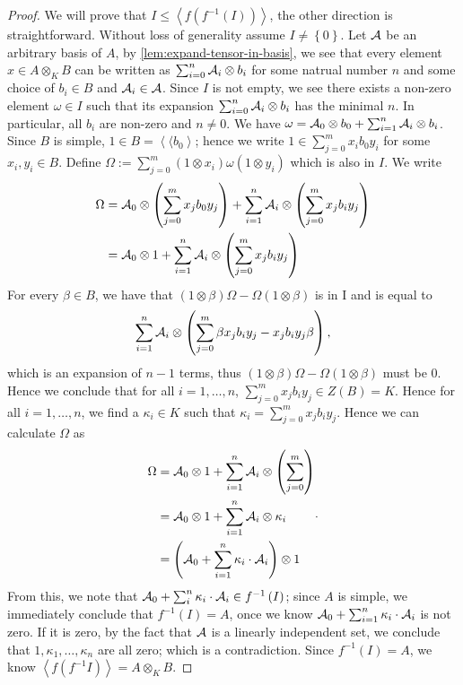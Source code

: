 \begin{proof}
  We will prove that $I \le \left\langle f\left(f^{-1}\left(I\right)\right)\right\rangle$, the other direction is straightforward.
  Without loss of generality assume $I\ne\left\{0\right\}$.
  Let $\mathcal{A}$ be an arbitrary basis of $A$, by \cref{lem:expand-tensor-in-basis}, we see that every element $x \in A\otimes_{K}B$ can be written as $\sum_{i=0}^{n}\mathcal{A}_{i}\otimes b_{i}$ for some natrual number $n$ and some choice of $b_{i}\in B$ and $\mathcal{A}_{i}\in \mathcal{A}$. Since $I$ is not empty, we see there exists a non-zero element $\omega\in I$ such that its expansion $\sum_{i=0}^{n}\mathcal{A}_{i}\otimes b_{i}$ has the minimal $n$. In particular, all $b_{i}$ are non-zero and $n\ne0$. We have $\omega=\mathcal{A}_{0}\otimes b_{0}+\sum_{i=1}^{n}\mathcal{A}_{i}\otimes b_{i}$. Since $B$ is simple, $1 \in B = \left\langle\langle b_{0} \right\rangle$; hence we write $1\in\sum_{j=0}^{m}x_{i}b_{0}y_{i}$ for some $x_{i},y_{i}\in B$. Define $\Omega := \sum_{j=0}^{m}(1\otimes x_{i})\omega(1\otimes y_{i})$ which is also in $I$. We write
\[
  \begin{aligned}
    \Omega &= \mathcal{A}_{0} \otimes \left(\sum_{j=0}^{m}x_{j}b_{0}y_{j}\right) + \sum_{i=1}^{n}\mathcal{A}_{i}\otimes\left(\sum_{j=0}^{m}x_{j}b_{i}y_{j}\right) \\
    &= \mathcal{A}_{0}\otimes 1 + \sum_{i=1}^{n}\mathcal{A}_{i}\otimes\left(\sum_{j=0}^{m}x_{j}b_{i}y_{j}\right)
  \end{aligned}
\]
For every $\beta\in B$, we have that $\left(1\otimes \beta\right)\Omega - \Omega\left(1\otimes \beta\right)$ is in I and is equal to
\[
\sum_{i=1}^{n}\mathcal{A}_{i}\otimes\left(\sum_{j=0}^{m}\beta x_{j}b_{i}y_{j}-x_{j}b_{i}y_{j}\beta\right),
\]
which is an expansion of $n-1$ terms, thus $\left(1\otimes\beta\right)\Omega-\Omega\left(1\otimes\beta\right)$ must be $0$. Hence we conclude that for all $i=1,\dots,n$,   $\sum_{j=0}^{m}x_{j}b_{i}y_{j}\in Z\left(B\right)=K$. Hence for all $i=1,\dots,n$, we find a $\kappa_{i}\in K$ such that $\kappa_{i}=\sum_{j=0}^{m}x_{j}b_{i}y_{j}$. Hence we can calculate $\Omega$ as
\[
  \begin{aligned}
    \Omega &= \mathcal{A}_{0}\otimes 1 + \sum_{i=1}^{n}\mathcal{A}_{i}\otimes\left(\sum_{j=0}^{m}\right) \\
      &= \mathcal{A}_{0}\otimes 1 + \sum_{i=1}^{n}\mathcal{A}_{i}\otimes\kappa_{i} \\
    &= \left(\mathcal{A}_{0}+\sum_{i=1}^{n}\kappa_{i}\cdot\mathcal{A}_{i}\right) \otimes 1
  \end{aligned}.
\]
From this, we note that $\mathcal{A}_{0}+\sum_{i}^{n}\kappa_{i}\cdot\mathcal{A}_{i}\in f^{-1}\left(I\right)$; since $A$ is simple, we immediately conclude that $f^{-1}\left(I\right) = A$, once we know $\mathcal{A}_{0}+\sum_{i=1}^{n}\kappa_{i}\cdot \mathcal{A}_{i}$ is not zero. If it is zero, by the fact that $\mathcal{A}$ is a linearly independent set, we conclude that $1,\kappa_{1},\dots,\kappa_{n}$ are all zero; which is a contradiction. Since $f^{-1}\left(I\right) = A$, we know $\left\langle f\left(f^{-1}I\right)\right\rangle = A \otimes_{K} B$.
\end{proof}

